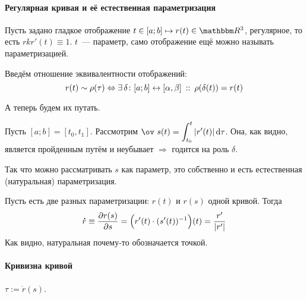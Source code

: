 \documentclass[12pt,draft,timbord]{longnotes}
\begin{document}
\paragraph{Регулярная кривая и её естественная параметризация}
\label{par:dg::curve}

\begin{defn}\label{defn:dg::curve::map}
  Пусть задано гладкое отображение $t\in [a;b] \mapsto r(t) \in \R^3$, регулярное, то есть
  $rk r'(t) \equiv 1$. $t$~--- параметр, само отображение ещё можно
  называть параметризацией.

\end{defn}

\begin{defn}\label{defn:dg::curve::class}
  Введём отношение эквивалентности отображений:
  \[
    r(t) \sim \rho(\tau) \Leftrightarrow 
    \exists\, \delta \colon [a;b] \leftrightarrow [\alpha, \beta ] \:::\: \rho (\delta (t)) = r(t)
  \]
\end{defn}

А теперь будем их путать. \flame

\begin{defn}\label{defn:dg::curve::nat}
  Пусть $[a;b] = [t_0, t_1]$.
  Рассмотрим $\ov~s(t) = \dint_{t_0}^t | r'(t) | \, \del \tau $. Она, как видно, является 
  пройденным путём и неубывает  $ \Rightarrow $ годится на роль $\delta$.

  Так что можно рассматривать $s$ как параметр,  это собственно и есть
  естественная (натуральная) параметризация.
\end{defn}


\begin{prop}\label{prop:dg::curve::repar}
  Пусть есть две разных параметризации: $r(t)$ и $r(s)$ одной кривой. Тогда 
  \[
    \accentset{\mbox{\bfseries .}}{r} \equiv \frac{\partial r(s)}{\partial s} = \Bigl(r'(t) \cdot (s'(t))^{-1}\Bigr)(t) = \frac{r'}{|r'|} 
  \]
  Как видно, натуральная почему-то обозначается точкой.
\end{prop}

\paragraph{Кривизна кривой}
\label{par:dg::curvature}

\begin{defn}\label{defn:dg::curvature::tang}
  $\tau := \dot r(s)$.
\end{defn}
\end{document}

